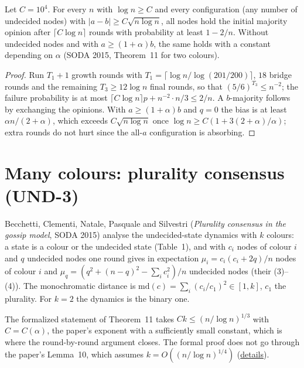 \begin{theorem}\label{thm:majority}
\leanok{}
Let $C=10^4$. For every $n$ with $\log n\ge C$ and every configuration (any number of undecided
nodes) with $|a-b|\ge C\sqrt{n\log n}$, all nodes hold the initial majority opinion after
$\lceil C\log n\rceil$ rounds with probability at least $1-2/n$. Without undecided nodes and with
$a\ge(1+\alpha)b$, the same holds with a constant depending on $\alpha$ (SODA 2015, Theorem~11
for two colours).
\end{theorem}
\begin{proof}\leanok
Run $T_1+1$ growth rounds with $T_1=\lceil\log n/\log(201/200)\rceil$, $18$ bridge rounds and the
remaining $T_3\ge 12\log n$ final rounds, so that $(5/6)^{T_3}\le n^{-2}$; the failure
probability is at most $\lceil C\log n\rceil p+n^{-2}\cdot n/3\le 2/n$. A $b$-majority follows by
exchanging the opinions. With $a\ge(1+\alpha)b$ and $q=0$ the bias is at least $\alpha n/(2+\alpha)$,
which exceeds $C\sqrt{n\log n}$ once $\log n\ge C(1+3(2+\alpha)/\alpha)$; extra rounds do not hurt
since the all-$a$ configuration is absorbing.
\end{proof}

\section{Many colours: plurality consensus (UND-3)}\label{sec:bcnps-plurality}
Becchetti, Clementi, Natale, Pasquale and Silvestri (\emph{Plurality consensus in the gossip
model}, SODA 2015) analyse the undecided-state dynamics with $k$ colours: a state is a colour or
the undecided state (Table~1), and with $c_i$ nodes of colour $i$ and $q$ undecided nodes one
round gives in expectation $\mu_i=c_i(c_i+2q)/n$ nodes of colour $i$ and
$\mu_q=(q^2+(n-q)^2-\sum_i c_i^2)/n$ undecided nodes (their (3)--(4)). The monochromatic distance
is $\mathrm{md}(c)=\sum_i(c_i/c_1)^2\in[1,k]$, $c_1$ the plurality. For $k=2$ the dynamics is the
binary one.

The formalized statement of Theorem~11 takes $Ck\le(n/\log n)^{1/3}$ with $C=C(\alpha)$, the
paper's exponent with a sufficiently small constant, which is where the round-by-round argument
closes. The formal proof does not go through the paper's Lemma~10, which assumes
$k=O((n/\log n)^{1/4})$
(\href{https://github.com/formal-dynamics/leanamics/blob/main/undecided/FORMALIZATION_DIFFERENCES.md#the-dynamics-with-k-colours-plurality-roadmap-und-3}{details}).

